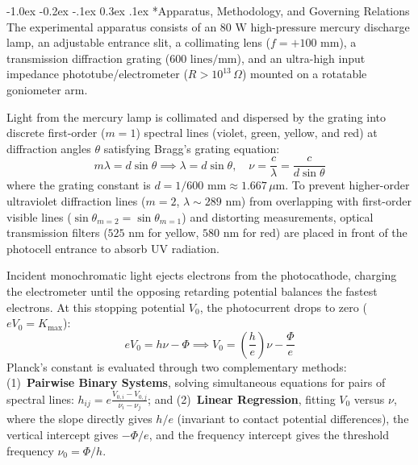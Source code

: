 \documentclass[11pt,a4paper]{article}
\makeatletter
\renewcommand\section{\@startsection {section}{1}{\z@}%
                                   {-1.0ex \@plus -0.2ex \@minus -.1ex}%
                                   {0.3ex \@plus .1ex}%
                                   {\normalfont\large\bfseries}}
\makeatother
\begin{document}
\section*{Apparatus, Methodology, and Governing Relations}
The experimental apparatus consists of an $80\text{ W}$ high-pressure mercury discharge lamp, an adjustable entrance slit, a collimating lens ($f = +100\text{ mm}$), a transmission diffraction grating ($600\text{ lines/mm}$), and an ultra-high input impedance phototube/electrometer ($R > 10^{13}\,\Omega$) mounted on a rotatable goniometer arm.

Light from the mercury lamp is collimated and dispersed by the grating into discrete first-order ($m = 1$) spectral lines (violet, green, yellow, and red) at diffraction angles $\theta$ satisfying Bragg's grating equation:
\begin{equation}
    m \lambda = d \sin\theta \implies \lambda = d \sin\theta, \quad \nu = \frac{c}{\lambda} = \frac{c}{d \sin\theta}
\end{equation}
where the grating constant is $d = 1/600\text{ mm} \approx 1.667\,\mu\text{m}$. To prevent higher-order ultraviolet diffraction lines ($m = 2$, $\lambda \sim 289\text{ nm}$) from overlapping with first-order visible lines ($\sin\theta_{m=2} = \sin\theta_{m=1}$) and distorting measurements, optical transmission filters ($525\text{ nm}$ for yellow, $580\text{ nm}$ for red) are placed in front of the photocell entrance to absorb UV radiation.

Incident monochromatic light ejects electrons from the photocathode, charging the electrometer until the opposing retarding potential balances the fastest electrons. At this stopping potential $V_0$, the photocurrent drops to zero ($e V_0 = K_{\max}$):
\begin{equation}
    e V_0 = h\nu - \Phi \implies V_0 = \left(\frac{h}{e}\right)\nu - \frac{\Phi}{e}
\end{equation}
Planck's constant is evaluated through two complementary methods: (1)~\textbf{Pairwise Binary Systems}, solving simultaneous equations for pairs of spectral lines: $h_{ij} = e \frac{V_{0,i} - V_{0,j}}{\nu_i - \nu_j}$; and (2)~\textbf{Linear Regression}, fitting $V_0$ versus $\nu$, where the slope directly gives $h/e$ (invariant to contact potential differences), the vertical intercept gives $-\Phi/e$, and the frequency intercept gives the threshold frequency $\nu_0 = \Phi/h$.
\end{document}
